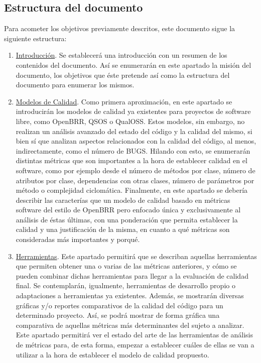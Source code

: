 \documentclass[11pt]{article}
\begin{document}
\subsection{Estructura del documento}
Para acometer los objetivos previamente descritos, este documento sigue la siguiente estructura:

\begin{enumerate}
\item{\underline{Introducción}}. Se establecerá una introducción con un resumen de los contenidos del documento. Así se enumerarán en este apartado la misión del documento, los objetivos que éste pretende así como la estructura del documento para enumerar los mismos.
\item{\underline{Modelos de Calidad}}. Como primera aproximación, en este apartado se introducirán los modelos de calidad ya existentes para proyectos de software libre, como OpenBRR, QSOS o QualOSS. Estos modelos, sin embargo, no realizan un análisis avanzado del estado del código y la calidad del mismo, si bien sí que analizan aspectos relacionados con la calidad del código, al menos, indirectamente, como el número de BUGS.
Hilando con esto, se enumerarán distintas métricas que son importantes a la hora de establecer calidad en el software, como por ejemplo desde el número de métodos por clase, número de atributos por clase, dependencias con otras clases, número de parámetros por método o complejidad ciclomática.
Finalmente, en este apartado se debería describir las caracterías que un modelo de calidad basado en métricas software del estilo de OpenBRR pero enfocado única y exclusivamente al análisis de éstas últimas, con una ponderación que permita establecer la calidad y una justificación de la misma, en cuanto a qué métricas son consideradas más importantes y porqué.
\item{\underline{Herramientas}}. Este apartado permitirá que se describan aquellas herramientas que permiten obtener una o varias de las métricas anteriores, y cómo se pueden combinar dichas herramientas para llegar a la evaluación de calidad final. Se contemplarán, igualmente, herramientas de desarrollo propio o adaptaciones a herramientas ya existentes. 
Además, se mostrarán diversas gráficas y/o reportes comparativos de la calidad del código para un determinado proyecto. Así, se podrá mostrar de forma gráfica una comparativa de aquellas métricas más determinantes del sujeto a analizar.
Este apartado permitirá ver el estado del arte de las herramientas de análisis de métricas para, de esta forma, empezar a establecer cuáles de ellas se van a utilizar a la hora de establecer el modelo de calidad propuesto.

\end{enumerate}
\end{document}
